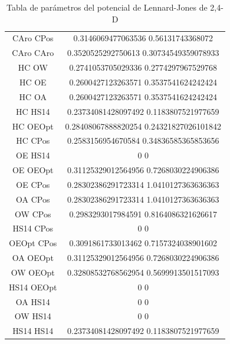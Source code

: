 \begin{table}[!h]
\begin{tabular}{|c|c|}
        CAro     CPos   &     0.3146069477063536 0.56131743368072\\
        CAro     CAro   &     0.3520525292750613 0.30734549359078933\\
        HC	OW	        &     0.2741053705029336 0.2774297967529768\\
        HC	OE	        &     0.2600427123263571 0.3537541624242424\\
        HC	OA	        &     0.2600427123263571 0.3537541624242424\\
        HC     HS14     &     0.23734081428097492 0.1183807521977659\\
        HC    OEOpt     &     0.28408067888820254 0.24321827026101842\\
        HC     CPos     &     0.2583156954670584 0.34836585365853656\\
        OE     HS14     &     0                   0\\
        OE    OEOpt     &     0.31125329012564956 0.7268030224906386\\
        OE     CPos     &     0.28302386291723314 1.0410127363636363\\
        OA     CPos     &     0.28302386291723314 1.0410127363636363\\
        OW     CPos     &     0.2983293017984591 0.8164086321626617\\
        HS14     CPos   &     0                   0\\
        OEOpt     CPos  &     0.3091861733013462 0.7157324038901602\\
        OA    OEOpt     &     0.31125329012564956 0.7268030224906386\\
        OW    OEOpt     &     0.32808532768562954 0.5699913501517093\\
        HS14    OEOpt   &     0                   0\\
        OA     HS14     &     0                   0\\
        OW     HS14     &     0                   0\\
        HS14     HS14   &     0.23734081428097492 0.1183807521977659\\
        \hline
    \end{tabular}
    \caption{Tabla de parámetros del potencial de Lennard-Jones de 2,4-D}
    \label{tab:lennardjonesall}
\end{table}
